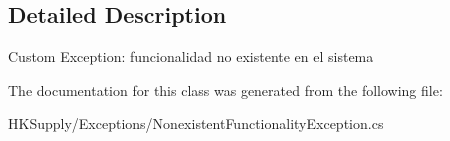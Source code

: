 \subsection{Detailed Description}
Custom Exception\+: funcionalidad no existente en el sistema 



The documentation for this class was generated from the following file\+:\begin{DoxyCompactItemize}
\item 
H\+K\+Supply/\+Exceptions/Nonexistent\+Functionality\+Exception.\+cs\end{DoxyCompactItemize}

